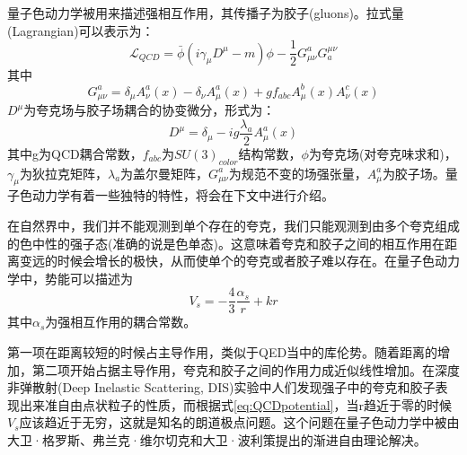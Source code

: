 量子色动力学被用来描述强相互作用，其传播子为胶子(gluons)。拉式量(Lagrangian)可以表示为：
\begin{equation}
    \mathcal{L}_{QCD} = \bar{\phi}(i \gamma_{\mu} D^{\mu}-m)\phi-\frac{1}{2}G^{a}_{\mu\nu}G^{\mu\nu}_{a}
\end{equation}
其中
\begin{equation}
    G^{a}_{\mu\nu} = \delta_{\mu}A_{\nu}^{a}(x) - \delta_{\nu}A_{\mu}^{a}(x) + gf_{abc}A_{\mu}^{b}(x)A_{\nu}^{c}(x)
\end{equation}
$D^{\mu}$为夸克场与胶子场耦合的协变微分，形式为：
\begin{equation}
    D^{\mu} = \delta_{\mu} - ig\frac{\lambda_{a}}{2}A_{\mu}^{a}(x)
\end{equation}
其中g为QCD耦合常数，$f_{abc}$为$SU(3)_{color}$结构常数，$\phi$为夸克场(对夸克味求和)，$\gamma_{\mu}$为狄拉克矩阵，$\lambda_{a}$为盖尔曼矩阵，$G^{a}_{\mu\nu}$为规范不变的场强张量，$A_{\mu}^{a}$为胶子场。量子色动力学有着一些独特的特性，将会在下文中进行介绍。

在自然界中，我们并不能观测到单个存在的夸克，我们只能观测到由多个夸克组成的色中性的强子态(准确的说是色单态)。这意味着夸克和胶子之间的相互作用在距离变远的时候会增长的极快，从而使单个的夸克或者胶子难以存在。在量子色动力学中，势能可以描述为
\begin{equation}
    V_s = -\frac{4}{3}\frac{\alpha_{s}}{r} + kr
    \label{eq:QCDpotential}
\end{equation}
其中$\alpha_{s}$为强相互作用的耦合常数。

第一项在距离较短的时候占主导作用，类似于QED当中的库伦势。随着距离的增加，第二项开始占据主导作用，夸克和胶子之间的作用力成近似线性增加。在深度非弹散射(Deep Inelastic Scattering, DIS)实验中人们发现强子中的夸克和胶子表现出来准自由点状粒子的性质，而根据式\ref{eq:QCDpotential}，当r趋近于零的时候$V_s$应该趋近于无穷，这就是知名的朗道极点问题。这个问题在量子色动力学中被由大卫·格罗斯、弗兰克·维尔切克和大卫·波利策提出的渐进自由理论解决。

